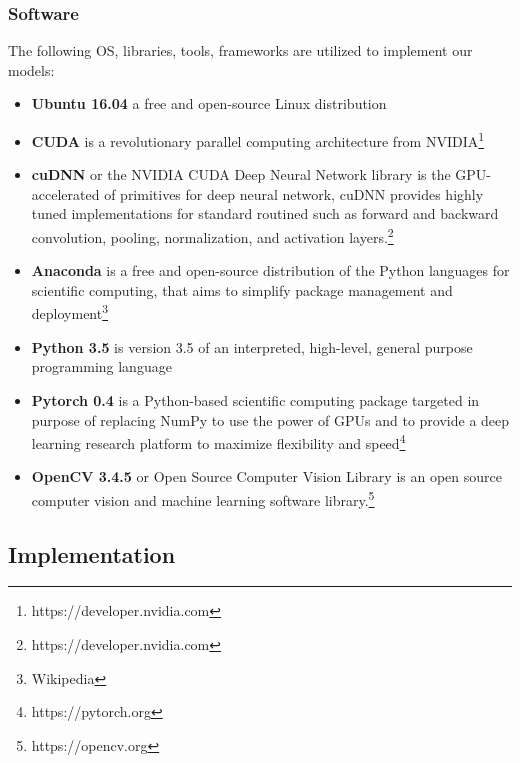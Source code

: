 \subsubsection{Software}
\hspace{0.5cm}The following OS, libraries, tools, frameworks are utilized to implement our models:
\begin{itemize}
    \item \textbf{Ubuntu 16.04} a free and open-source Linux distribution
    \item \textbf{CUDA} is a revolutionary parallel computing architecture from NVIDIA\footnote{https://developer.nvidia.com}
    \item \textbf{cuDNN} or the NVIDIA CUDA Deep Neural Network library is the GPU-accelerated of primitives for deep neural network, 
    cuDNN provides highly tuned implementations for standard routined such as forward and backward convolution, pooling, normalization, 
    and activation layers.\footnote{https://developer.nvidia.com}
    \item \textbf{Anaconda} is a free and open-source distribution of the Python languages for scientific computing, that aims to simplify package management and deployment\footnote{Wikipedia}
    \item \textbf{Python 3.5} is version 3.5 of an interpreted, high-level, general purpose programming language
    \item \textbf{Pytorch 0.4} is a Python-based scientific computing package targeted in purpose of replacing NumPy to use the power of GPUs and to provide a deep learning research platform to maximize flexibility and speed\footnote{https://pytorch.org}
    \item \textbf{OpenCV 3.4.5} or Open Source Computer Vision Library is an open source computer vision and machine learning software library.\footnote{https://opencv.org}
\end{itemize}

\subsection{Implementation}

